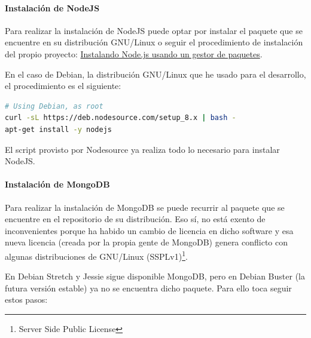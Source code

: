 \documentclass[spanish,12pt, a4paper, twoside]{paper}
\begin{document}
\paragraph{Instalación de NodeJS}

Para realizar la instalación de NodeJS puede optar por instalar el paquete que se encuentre en su distribución GNU/Linux o seguir el procedimiento de instalación del propio proyecto: \href{https://nodejs.org/es/download/package-manager/}{Instalando Node.js usando un gestor de paquetes}.
\newline

En el caso de Debian, la distribución GNU/Linux que he usado para el desarrollo, el procedimiento es el siguiente:

\begin{lstlisting}[language=sh]
# Using Debian, as root
curl -sL https://deb.nodesource.com/setup_8.x | bash -
apt-get install -y nodejs
\end{lstlisting}

El script provisto por Nodesource ya realiza todo lo necesario para instalar NodeJS.

\paragraph{Instalación de MongoDB} Para realizar la instalación de MongoDB se puede recurrir al paquete que se encuentre en el repositorio de su distribución. Eso sí, no está exento de inconvenientes porque ha habido un cambio de licencia en dicho software y esa nueva licencia (creada por la propia gente de MongoDB) genera conflicto con algunas distribuciones de GNU/Linux (SSPLv1)\footnote{Server Side Public License}.

En Debian Stretch y Jessie sigue disponible MongoDB, pero en Debian Buster (la futura versión estable) ya no se encuentra dicho paquete. Para ello toca seguir estos pasos:
\end{document}
